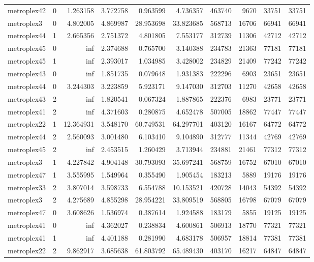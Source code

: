 \begin{longtable}{|l|r|r|r|r|r|r|r|r|r|}
metroplex42 & 0 & 1.263158 & 3.772758 & 0.963599 & 4.736357 & 463740 & 9670 & 33751 & 33751 \\
metroplex3 & 0 & 4.802005 & 4.869987 & 28.953698 & 33.823685 & 568713 & 16706 & 66941 & 66941 \\
metroplex44 & 1 & 2.665356 & 2.751372 & 4.801805 & 7.553177 & 312739 & 11306 & 42712 & 42712 \\
metroplex45 & 0 & inf & 2.374688 & 0.765700 & 3.140388 & 234783 & 21363 & 77181 & 77181 \\
metroplex45 & 1 & inf & 2.393017 & 1.034985 & 3.428002 & 234829 & 21409 & 77242 & 77242 \\
metroplex43 & 0 & inf & 1.851735 & 0.079648 & 1.931383 & 222296 & 6903 & 23651 & 23651 \\
metroplex44 & 0 & 3.244303 & 3.223859 & 5.923171 & 9.147030 & 312703 & 11270 & 42658 & 42658 \\
metroplex43 & 2 & inf & 1.820541 & 0.067324 & 1.887865 & 222376 & 6983 & 23771 & 23771 \\
metroplex41 & 2 & inf & 4.371603 & 0.280875 & 4.652478 & 507005 & 18862 & 77447 & 77447 \\
metroplex22 & 1 & 12.364931 & 3.548170 & 60.749531 & 64.297701 & 403120 & 16167 & 64772 & 64772 \\
metroplex44 & 2 & 2.560093 & 3.001480 & 6.103410 & 9.104890 & 312777 & 11344 & 42769 & 42769 \\
metroplex45 & 2 & inf & 2.453515 & 1.260429 & 3.713944 & 234881 & 21461 & 77312 & 77312 \\
metroplex3 & 1 & 4.227842 & 4.904148 & 30.793093 & 35.697241 & 568759 & 16752 & 67010 & 67010 \\
metroplex47 & 1 & 3.555995 & 1.549964 & 0.355490 & 1.905454 & 183213 & 5889 & 19176 & 19176 \\
metroplex33 & 2 & 3.807014 & 3.598733 & 6.554788 & 10.153521 & 420728 & 14043 & 54392 & 54392 \\
metroplex3 & 2 & 4.275689 & 4.855298 & 28.954221 & 33.809519 & 568805 & 16798 & 67079 & 67079 \\
metroplex47 & 0 & 3.608626 & 1.536974 & 0.387614 & 1.924588 & 183179 & 5855 & 19125 & 19125 \\
metroplex41 & 0 & inf & 4.362027 & 0.238834 & 4.600861 & 506913 & 18770 & 77321 & 77321 \\
metroplex41 & 1 & inf & 4.401188 & 0.281990 & 4.683178 & 506957 & 18814 & 77381 & 77381 \\
metroplex22 & 2 & 9.862917 & 3.685638 & 61.803792 & 65.489430 & 403170 & 16217 & 64847 & 64847 \\

\end{longtable}
